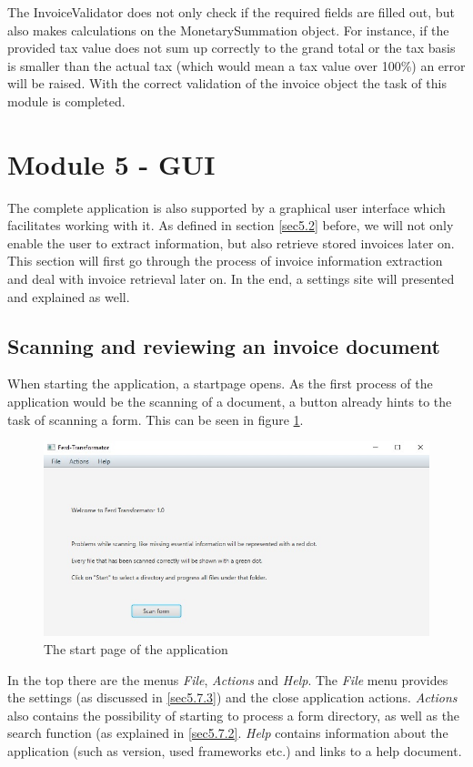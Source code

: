 The InvoiceValidator does not only check if the required fields are filled out, but also makes calculations on the MonetarySummation object. For instance, if the provided tax value does not sum up correctly to the grand total or the tax basis is smaller than the actual tax (which would mean a tax value over 100\%) an error will be raised.
With the correct validation of the invoice object the task of this module is completed. 

\section{Module 5 - GUI}
\label{sec5.8}
The complete application is also supported by a graphical user interface which facilitates working with it.
As defined in section \ref{sec5.2} before, we will not only enable the user to extract information, but also retrieve stored invoices later on. This section will first go through the process of invoice information extraction and deal with invoice retrieval later on. In the end, a settings site will presented and explained as well.

\subsection{Scanning and reviewing an invoice document}
\label{sec5.8.1}

When starting the application, a startpage opens. As the first process of the application would be the scanning of a document, a button already hints to the task of scanning a form. This can be seen in figure \ref{startmenu}.
\begin{figure}[ht!]
\centering
\includegraphics[scale=0.6]{Images/GUI/startmenu.jpg}
\caption{The start page of the application \label{startmenu}}
\end{figure}

In the top there are the menus \emph{File}, \emph{Actions} and \emph{Help}. The \emph{File} menu provides the settings (as discussed in \ref{sec5.7.3}) and the close application actions.
\emph{Actions} also contains the possibility of starting to process a form directory, as well as the search function (as explained in \ref{sec5.7.2}.
\emph{Help} contains information about the application (such as version, used frameworks etc.) and links to a help document.

